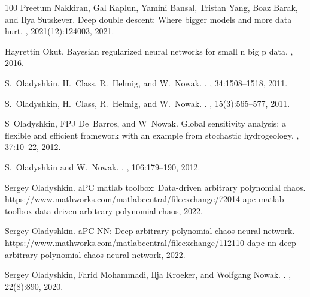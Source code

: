 \documentclass[a4paper,fleqn]{article}
\begin{document}
\begin{thebibliography}{100}
Preetum Nakkiran, Gal Kaplun, Yamini Bansal, Tristan Yang, Boaz Barak, and Ilya
  Sutskever.
\newblock Deep double descent: Where bigger models and more data hurt.
,
  2021(12):124003, 2021.

Hayrettin Okut.
\newblock Bayesian regularized neural networks for small n big p data.
, 2016.

S.~Oladyshkin, H.~Class, R.~Helmig, and W.~Nowak.
.
, 34:1508--1518, 2011.

S.~Oladyshkin, H.~Class, R.~Helmig, and W.~Nowak.
.
, 15(3):565--577, 2011.

S~Oladyshkin, FPJ De~Barros, and W~Nowak.
\newblock Global sensitivity analysis: a flexible and efficient framework with
  an example from stochastic hydrogeology.
, 37:10--22, 2012.

S.~Oladyshkin and W.~Nowak.
.
, 106:179--190, 2012.

Sergey Oladyshkin.
\newblock a{P}{C} matlab toolbox: Data-driven arbitrary polynomial chaos.
\newblock
  {\url{https://www.mathworks.com/matlabcentral/fileexchange/72014-apc-matlab-toolbox-data-driven-arbitrary-polynomial-chaos}},
  2022.

Sergey Oladyshkin.
a{P}{C} {N}{N}: Deep arbitrary polynomial chaos neural network.
\newblock
  {\url{https://www.mathworks.com/matlabcentral/fileexchange/112110-dapc-nn-deep-arbitrary-polynomial-chaos-neural-network}},
  2022.

Sergey Oladyshkin, Farid Mohammadi, Ilja Kroeker, and Wolfgang Nowak.
.
, 22(8):890, 2020.


\end{thebibliography}
\end{document}
